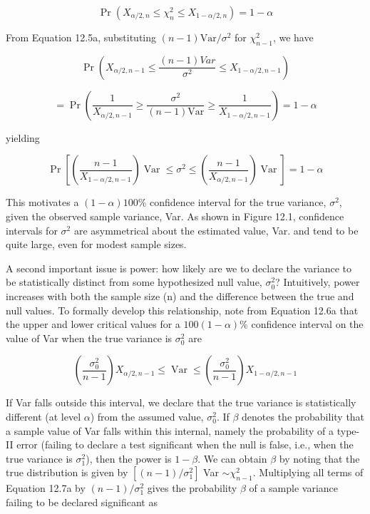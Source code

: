 \documentclass{article}
\begin{document}
\begin{equation}
\Pr(X_{\alpha/2,n}\leq\chi_{n}^{2}\leq X_{1-\alpha/2,n})=1-\alpha
\tag{12.5b}
\label{eq:12_5b}
\end{equation}

From Equation 12.5a, substituting  $ (n-1)\mathrm{Var}/\sigma^{2} $ for  $ \chi_{n-1}^{2} $, we have

\begin{equation}
\Pr\left(X_{\alpha/2,n-1}\leq\frac{(n-1)Var}{\sigma^{2}}\leq X_{1-\alpha/2,n-1}\right)
\tag{12.6a}
\label{eq:12_6a}
\end{equation}

\begin{equation}
=\Pr\left(\frac{1}{X_{\alpha/2,n-1}}\geq\frac{\sigma^{2}}{(n-1)\mathrm{Var}}\geq\frac{1}{X_{1-\alpha/2,n-1}}\right)=1-\alpha
\tag{12.6b}
\label{eq:12_6b}
\end{equation}

yielding

\begin{equation}
\Pr\left[\left(\frac{n-1}{X_{1-\alpha/2,n-1}}\right)\operatorname{Var}\leq\sigma^{2}\leq\left(\frac{n-1}{X_{\alpha/2,n-1}}\right)\operatorname{Var}\right]=1-\alpha
\tag{12.6c}
\label{eq:12_6c}
\end{equation}

This motivates a  $ (1-\alpha)100\% $ confidence interval for the true variance,  $ \sigma^{2} $, given the observed sample variance, Var. As shown in Figure 12.1, confidence intervals for  $ \sigma^{2} $ are asymmetrical about the estimated value, Var. and tend to be quite large, even for modest sample sizes.

A second important issue is power: how likely are we to declare the variance to be statistically distinct from some hypothesized null value,  $ \sigma_0^2 $? Intuitively, power increases with both the sample size (n) and the difference between the true and null values. To formally develop this relationship, note from Equation 12.6a that the upper and lower critical values for a  $ 100(1 - \alpha)\% $ confidence interval on the value of Var when the true variance is  $ \sigma_0^2 $ are

\begin{equation}
\left(\frac{\sigma_{0}^{2}}{n-1}\right)X_{\alpha/2,n-1}\leq\operatorname{Var}\leq\left(\frac{\sigma_{0}^{2}}{n-1}\right)X_{1-\alpha/2,n-1}
\tag{12.7a}
\label{eq:12_7a}
\end{equation}

If Var falls outside this interval, we declare that the true variance is statistically different (at level  $ \alpha $) from the assumed value,  $ \sigma_0^2 $. If  $ \beta $ denotes the probability that a sample value of Var falls within this internal, namely the probability of a type-II error (failing to declare a test significant when the null is false, i.e., when the true variance is  $ \sigma_1^2 $), then the power is  $ 1 - \beta $. We can obtain  $ \beta $ by noting that the true distribution is given by  $ [(n - 1)/\sigma_1^2] $ Var  $ \sim \chi_{n-1}^2 $. Multiplying all terms of Equation 12.7a by  $ (n - 1)/\sigma_1^2 $ gives the probability  $ \beta $ of a sample variance failing to be declared significant as
\end{document}
